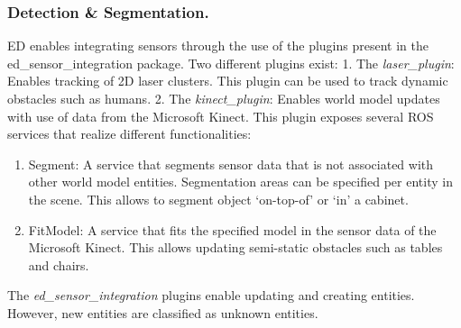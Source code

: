 \subsubsection{Detection \& Segmentation.}
ED enables integrating sensors through the use of the plugins present in the ed\_sensor\_integration package. Two different plugins exist:
1. The \emph{laser\_plugin}: Enables tracking of 2D laser clusters. This plugin can be used to track dynamic obstacles such as humans.
2. The \emph{kinect\_plugin}: Enables world model updates with use of data from the Microsoft Kinect\texttrademark. This plugin exposes several ROS services that realize different functionalities:
\begin{enumerate}[label=(\alph*)]
\item Segment: A service that segments sensor data that is not associated with other world model entities. Segmentation areas can be specified per entity in the scene. This allows to segment object ‘on-top-of’ or ‘in’ a cabinet.
\item FitModel: A service that fits the specified model in the sensor data of the Microsoft Kinect\texttrademark. This allows updating semi-static obstacles such as tables and chairs.
\end{enumerate}


The \emph{ed\_sensor\_integration} plugins enable updating and creating entities. However, new entities are classified as unknown entities.
